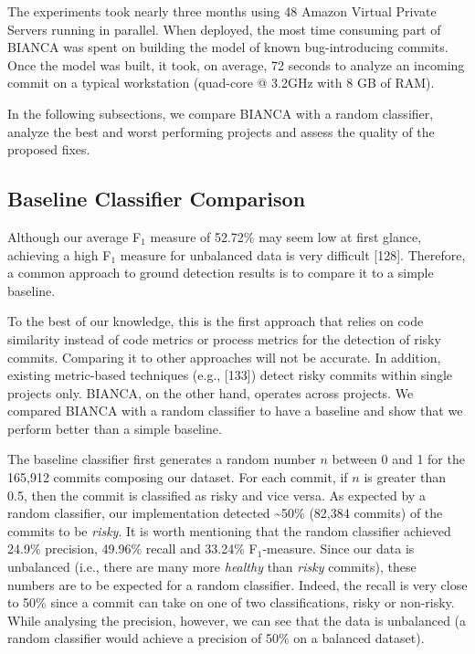 \documentclass[12pt]{report}
\begin{document}
The experiments took nearly three months using 48 Amazon Virtual Private
Servers running in parallel. When deployed, the most time consuming part
of BIANCA was spent on building the model of known bug-introducing
commits. Once the model was built, it took, on average, 72 seconds to
analyze an incoming commit on a typical workstation (quad-core @ 3.2GHz
with 8 GB of RAM).

In the following subsections, we compare BIANCA with a random
classifier, analyze the best and worst performing projects and assess
the quality of the proposed fixes.

\subsection{Baseline Classifier
Comparison}\label{baseline-classifier-comparison}

Although our average F\(_1\) measure of 52.72\% may seem low at first
glance, achieving a high F\(_1\) measure for unbalanced data is very
difficult {[}128{]}. Therefore, a common approach to ground detection
results is to compare it to a simple baseline.

To the best of our knowledge, this is the first approach that relies on
code similarity instead of code metrics or process metrics for the
detection of risky commits. Comparing it to other approaches will not be
accurate. In addition, existing metric-based techniques (e.g.,
{[}133{]}) detect risky commits within single projects only. BIANCA, on
the other hand, operates across projects. We compared BIANCA with a
random classifier to have a baseline and show that we perform better
than a simple baseline.

The baseline classifier first generates a random number \(n\) between 0
and 1 for the 165,912 commits composing our dataset. For each commit, if
\(n\) is greater than 0.5, then the commit is classified as risky and
vice versa. As expected by a random classifier, our implementation
detected \textasciitilde{}50\% (82,384 commits) of the commits to be
\emph{risky}. It is worth mentioning that the random classifier achieved
24.9\% precision, 49.96\% recall and 33.24\% F\(_1\)-measure. Since our
data is unbalanced (i.e., there are many more \emph{healthy} than
\emph{risky} commits), these numbers are to be expected for a random
classifier. Indeed, the recall is very close to 50\% since a commit can
take on one of two classifications, risky or non-risky. While analysing
the precision, however, we can see that the data is unbalanced (a random
classifier would achieve a precision of 50\% on a balanced dataset).
\end{document}
